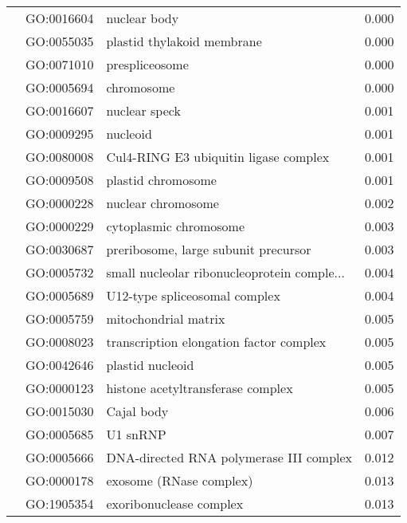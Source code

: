 \begin{longtable}{lllr}
   & GO:0016604 &                                 nuclear body &         0.000 \\
   & GO:0055035 &                   plastid thylakoid membrane &         0.000 \\
   & GO:0071010 &                               prespliceosome &         0.000 \\
   & GO:0005694 &                                   chromosome &         0.000 \\
   & GO:0016607 &                                nuclear speck &         0.001 \\
   & GO:0009295 &                                     nucleoid &         0.001 \\
   & GO:0080008 &        Cul4-RING E3 ubiquitin ligase complex &         0.001 \\
   & GO:0009508 &                           plastid chromosome &         0.001 \\
   & GO:0000228 &                           nuclear chromosome &         0.002 \\
   & GO:0000229 &                       cytoplasmic chromosome &         0.003 \\
   & GO:0030687 &         preribosome, large subunit precursor &         0.003 \\
   & GO:0005732 &  small nucleolar ribonucleoprotein comple... &         0.004 \\
   & GO:0005689 &                U12-type spliceosomal complex &         0.004 \\
   & GO:0005759 &                         mitochondrial matrix &         0.005 \\
   & GO:0008023 &      transcription elongation factor complex &         0.005 \\
   & GO:0042646 &                             plastid nucleoid &         0.005 \\
   & GO:0000123 &            histone acetyltransferase complex &         0.005 \\
   & GO:0015030 &                                   Cajal body &         0.006 \\
   & GO:0005685 &                                     U1 snRNP &         0.007 \\
   & GO:0005666 &      DNA-directed RNA polymerase III complex &         0.012 \\
   & GO:0000178 &                      exosome (RNase complex) &         0.013 \\
   & GO:1905354 &                      exoribonuclease complex &         0.013 \\

\end{longtable}
